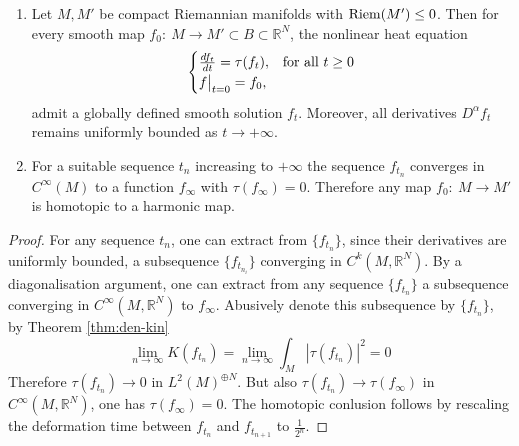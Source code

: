 \begin{theorem}
\label{thm:final}
\begin{enumerate}
\item Let \(M, M'\) be compact Riemannian manifolds with \(\mathop{\rm Riem}\nolimits(M') \leq 0\). Then for
every smooth map \(f_0:\ M \longrightarrow M'\subset B\subset \mathbb{R}^N\), the
nonlinear heat equation
\begin{equation*}
\begin{cases}
\frac{df_t}{dt} = \tau(f_t),  & \text{for all $t\geq 0$} \\
\restr{f}{t=0} = f_0,
\end{cases}      
\end{equation*}
admit a globally defined smooth solution \(f_t\). Moreover, all derivatives \(D^\alpha
   f_t\) remains uniformly bounded as \(t\to +\infty\).
\item For a suitable sequence \(t_n\) increasing to \(+\infty\) the sequence \(f_{t_n}\) converges in \(C^\infty(M)\) to a function \(f_\infty\) with \(\tau(f_\infty)=0\). Therefore any map \(f_0:\ M \longrightarrow M'\) is homotopic to a harmonic map.
\end{enumerate}
\end{theorem}
\begin{proof}
For any sequence \(t_n\), one can extract from \(\{f_{t_n}\}\), since their derivatives are
uniformly bounded, a subsequence \(\{f_{t_{n_i}}\}\) converging in \(C^k(M,
\mathbb{R}^N)\). By a diagonalisation argument, one can extract from any sequence \(\{f_{t_n}\}\) a subsequence converging in \(C^\infty(M, \mathbb{R}^N)\) to \(f_\infty\). Abusively denote this subsequence by \(\{f_{t_n}\}\), by Theorem \ref{thm:den-kin}
\[
 \lim_{n\to\infty} K(f_{t_n}) = \lim_{n\to\infty} \int_M |\tau(f_{t_n})|^2 = 0
\]
Therefore \(\tau(f_{t_n}) \to 0\) in \(L^2(M)^{\oplus N}\). But also \(\tau(f_{t_n})
\to \tau(f_\infty)\) in \(C^\infty(M, \mathbb{R}^N)\), one has \(\tau(f_\infty)=0\). The homotopic conlusion follows by rescaling the deformation time between \(f_{t_n}\) and \(f_{t_{n+1}}\) to \(\frac{1}{2^n}\).
\end{proof}